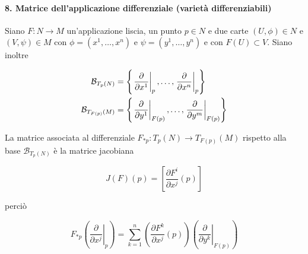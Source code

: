 \paragraph{8. Matrice dell'applicazione differenziale (varietà differenziabili)}

Siano $ F : N \to M $ un'applicazione liscia, un punto $ p \in N $ e due carte $ (U,\phi) \in N $ e $ (V,\psi) \in M $ con $ \phi = (x^{1},\dots,x^{n}) $ e $ \psi = (y^{1},\dots,y^{n}) $ e con $ F(U) \subset V $. Siano inoltre

\begin{align}
	\begin{split}
		\mathcal{B}_{T_{p}(N)} &= \left\{ \eval{ \pdv{x^{1}} }_{p}, \dots, \eval{ \pdv{x^{n}} }_{p} \right\}\\
		\mathcal{B}_{T_{F(p)}(M)} &= \left\{ \eval{ \pdv{y^{1}} }_{F(p)}, \dots, \eval{ \pdv{y^{m}} }_{F(p)} \right\}
	\end{split}
\end{align}

La matrice associata al differenziale $ F_{*p} : T_{p}(N) \to T_{F(p)}(M) $ rispetto alla base $ \mathcal{B}_{T_{p}(N)} $ è la matrice jacobiana

\begin{equation}
	J(F)(p) = \left[ \dfrac{\partial F^{i}}{\partial x^{j}} (p) \right]
\end{equation}

perciò

\begin{equation}
	F_{*p} \left( \left. \dfrac{\partial}{\partial x^{j}} \right|_{p} \right) = \sum_{k=1}^{n} \left( \dfrac{\partial F^{k}}{\partial x^{j}} (p) \right) \left( \left. \dfrac{\partial}{\partial y^{k}} \right|_{F(p)} \right)
\end{equation}


